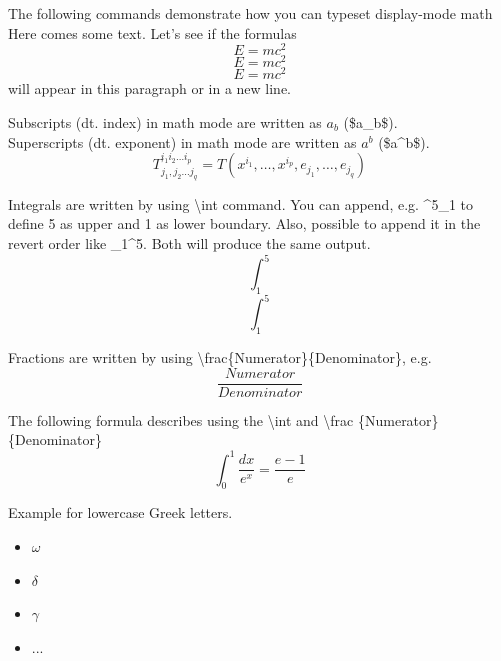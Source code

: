     The following commands demonstrate how you can typeset display-mode math
    Here comes some text. Let's see if the formulas 
    \[E=mc^2\]
    \begin{displaymath}
        E=mc^2
    \end{displaymath}
    \begin{equation}
        E=mc^2
    \end{equation}
    will appear in this paragraph
    or in a new line.

    Subscripts (dt. index) in math mode are written as $a_b$ (\$a\_b\$). \\
    Superscripts (dt. exponent) in math mode are written as $a^b$ (\$a\^{}b\$). \\

    \[T^{i_1i_2 \dots i_p}_{j_1,j_2 \dots j_q} = 
    T(x^{i_1},\dots,x^{i_p},e_{j_1},\dots,e_{j_q})\]

    Integrals are written by using \textbackslash int command. You can
    append, e.g. \^{}5\_1 to define 5 as upper and 1 as 
    lower boundary. Also, possible to append it in the revert order like 
    \_{}1\^{}5. Both will produce the same output. 
    \[\int^5_1\]
    \[\int_1^5\]


    Fractions are written by using \textbackslash frac\{Numerator\}\{Denominator\}, e.g.
    \begin{displaymath}
        \frac{Numerator}{Denominator}
    \end{displaymath}

    The following formula describes using the \textbackslash int and
    \textbackslash frac \{Numerator\}\{Denominator\}
    \begin{equation}
        \int^1_0 \frac{dx}{e^x} = \frac{e-1}{e}    
    \end{equation}

    \clearpage
    Example for lowercase Greek letters.
    \begin{itemize}
        \item $\omega$
        \item $\delta$
        \item $\gamma$
        \item ...
    \end{itemize}

